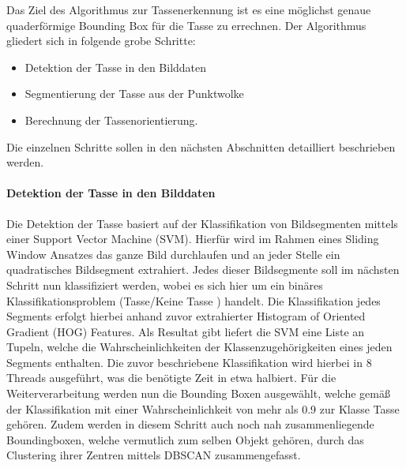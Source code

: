 Das Ziel des Algorithmus zur Tassenerkennung ist es eine möglichst genaue quaderförmige Bounding Box für die Tasse zu errechnen. Der Algorithmus gliedert sich in folgende grobe Schritte:
\begin{itemize}
\item Detektion der Tasse in den Bilddaten
\item Segmentierung der Tasse aus der Punktwolke
\item Berechnung der Tassenorientierung.
\end{itemize}
Die einzelnen Schritte sollen in den nächsten Abschnitten detailliert beschrieben werden.
\paragraph{Detektion der Tasse in den Bilddaten}
Die Detektion der Tasse basiert auf der Klassifikation von Bildsegmenten mittels einer Support Vector Machine (SVM). Hierfür wird im Rahmen eines Sliding Window Ansatzes das ganze Bild durchlaufen und an jeder Stelle ein quadratisches Bildsegment extrahiert. Jedes dieser Bildsegmente soll im nächsten Schritt nun klassifiziert werden, wobei es sich hier um ein binäres Klassifikationsproblem (\glqq Tasse\grqq/\glqq Keine Tasse \grqq) handelt. Die Klassifikation jedes Segments erfolgt hierbei anhand zuvor extrahierter Histogram of Oriented Gradient (HOG) Features. Als Resultat gibt liefert die SVM eine Liste an Tupeln, welche die Wahrscheinlichkeiten der Klassenzugehörigkeiten eines jeden Segments enthalten. Die zuvor beschriebene Klassifikation wird hierbei in 8 Threads ausgeführt, was die benötigte Zeit in etwa halbiert. Für die Weiterverarbeitung werden nun die Bounding Boxen ausgewählt, welche gemäß der Klassifikation mit einer Wahrscheinlichkeit von mehr als 0.9 zur Klasse Tasse gehören. Zudem werden in diesem Schritt auch noch nah zusammenliegende Boundingboxen, welche vermutlich zum selben Objekt gehören, durch das Clustering ihrer Zentren mittels DBSCAN zusammengefasst.


